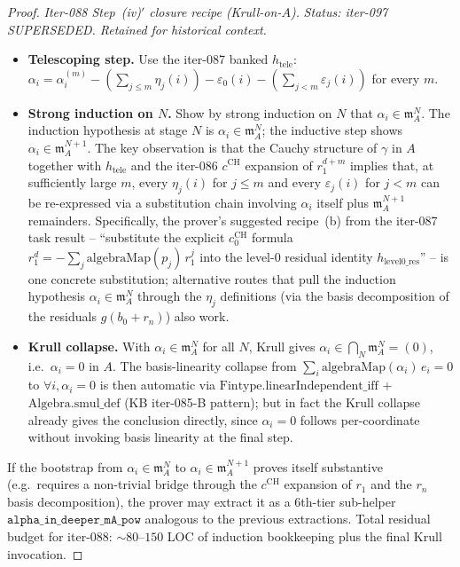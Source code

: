 \begin{proof}
\textit{Iter-088 Step~(iv)$'$ closure recipe (Krull-on-$A$).}
\textit{Status: iter-097 SUPERSEDED. Retained for historical
context.}
\begin{itemize}
\item \textbf{Telescoping step.} Use the iter-087 banked
$h_{\mathrm{tele}}$:
$\alpha_i = \alpha^{(m)}_i - (\sum_{j \le m} \eta_j(i)) -
\varepsilon_0(i) - (\sum_{j < m} \varepsilon_j(i))$ for every $m$.
\item \textbf{Strong induction on $N$.} Show by strong induction
on $N$ that $\alpha_i \in \mathfrak m_A^N$. The induction
hypothesis at stage $N$ is $\alpha_i \in \mathfrak m_A^N$; the
inductive step shows $\alpha_i \in \mathfrak m_A^{N+1}$. The
key observation is that the Cauchy structure of $\gamma$ in $A$
together with $h_{\mathrm{tele}}$ and the iter-086
$c^{\mathrm{CH}}$ expansion of $r_1^{d+m}$ implies that, at
sufficiently large $m$, every $\eta_j(i)$ for $j \le m$ and
every $\varepsilon_j(i)$ for $j < m$ can be re-expressed via a
substitution chain involving $\alpha_i$ itself plus $\mathfrak m_A^{N+1}$
remainders. Specifically, the prover's
suggested recipe~(b) from the iter-087 task result --
``substitute the explicit
$c^{\mathrm{CH}}_0$ formula $r_1^d = -\sum_j \mathrm{algebraMap}(p_j)\,r_1^j$
into the level-$0$ residual identity $h_{\mathrm{level0\_res}}$''
-- is one concrete substitution; alternative routes that pull
the induction hypothesis $\alpha_i \in \mathfrak m_A^N$ through
the $\eta_j$ definitions (via the basis decomposition of the
residuals $g(b_0 + r_n)$) also work.
\item \textbf{Krull collapse.} With $\alpha_i \in \mathfrak m_A^N$
for all $N$, Krull gives $\alpha_i \in \bigcap_N \mathfrak m_A^N
= (0)$, i.e.\ $\alpha_i = 0$ in $A$. The basis-linearity
collapse from $\sum_i \mathrm{algebraMap}(\alpha_i)\,e_i = 0$
to $\forall i, \alpha_i = 0$ is then automatic via
$\mathrm{Fintype.linearIndependent\_iff}$ + $\mathrm{Algebra.smul\_def}$
(KB iter-085-B pattern); but in fact the Krull collapse already
gives the conclusion directly, since $\alpha_i = 0$ follows
per-coordinate without invoking basis linearity at the final
step.
\end{itemize}

If the bootstrap from $\alpha_i \in \mathfrak m_A^N$ to
$\alpha_i \in \mathfrak m_A^{N+1}$ proves itself substantive
(e.g.\ requires a non-trivial bridge through the
$c^{\mathrm{CH}}$ expansion of $r_1$ and the $r_n$ basis
decomposition), the prover may extract it as a 6th-tier sub-helper
$\texttt{alpha\_in\_deeper\_mA\_pow}$ analogous to the previous
extractions. Total residual budget for iter-088: $\sim 80$--$150$
LOC of induction bookkeeping plus the final Krull invocation.


\end{proof}
